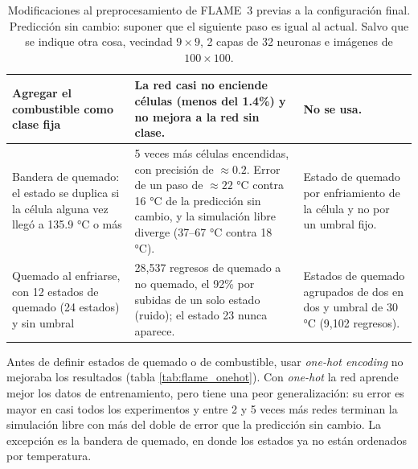 \begin{table}[htbp]
\begin{tabularx}{\textwidth}{p{}Xp{}}
			Agregar el combustible como clase fija &
			La red casi no enciende células (menos del 1.4\%) y no mejora a la red sin clase. &
			No se usa. \\ \midrule
			
			Bandera de quemado: el estado se duplica si la célula alguna vez llegó a 135.9 °C o más &
			5 veces más células encendidas, con precisión de $\approx 0.2$. Error de un paso de $\approx 22$ °C contra 16 °C de la predicción sin cambio, y la simulación libre diverge (37--67 °C contra 18 °C). &
			Estado de quemado por enfriamiento de la célula y no por un umbral fijo. \\ \midrule
			
			Quemado al enfriarse, con 12 estados de quemado (24 estados) y sin umbral &
			28,537 regresos de quemado a no quemado, el 92\% por subidas de un solo estado (ruido); el estado 23 nunca aparece. &
			Estados de quemado agrupados de dos en dos y umbral de 30 °C (9,102 regresos). \\ \bottomrule
			
		\end{tabularx}
		\caption{Modificaciones al preprocesamiento de FLAME~3 previas a la configuración final. Predicción sin cambio: suponer que el siguiente paso es igual al actual. Salvo que se indique otra cosa, vecindad $9 \times 9$, 2 capas de 32 neuronas e imágenes de $100 \times 100$.}
		\label{tab:flame_experiments}
	\end{table}
	
	Antes de definir estados de quemado o de combustible, usar \textit{one-hot encoding} no mejoraba los resultados (tabla \ref{tab:flame_onehot}). Con \textit{one-hot} la red aprende mejor los datos de entrenamiento, pero tiene una peor generalización: su error es mayor en casi todos los experimentos y entre 2 y 5 veces más redes terminan la simulación libre con más del doble de error que la predicción sin cambio. La excepción es la bandera de quemado, en donde los estados ya no están ordenados por temperatura.

